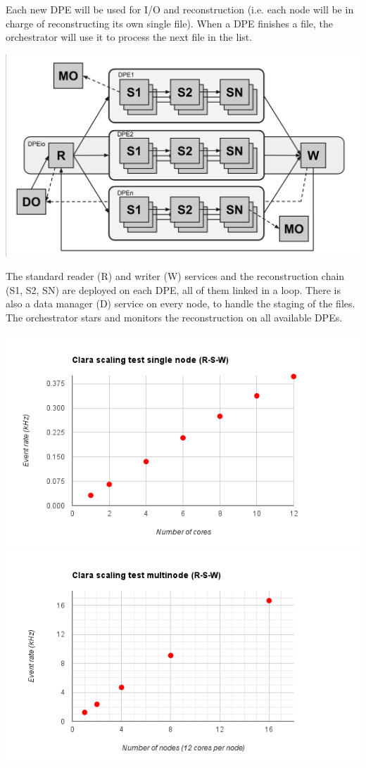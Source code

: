 \documentclass[a0paper,portrait]{baposter}
\begin{document}
\begin{poster}
{  Each new DPE will be used for I/O and reconstruction (i.e. each node will be
  in charge of reconstructing its own single file). When a DPE finishes a
  file, the orchestrator will use it to process the next file in the list.


\begin{center}
\includegraphics[width=0.7\linewidth]{multinode-reconstruction}
\end{center}

The standard reader (R) and writer (W) services and the reconstruction chain
(S1, S2, SN) are deployed on each DPE, all of them linked in a loop. There is
also a data manager (D) service on every node, to handle the staging of the
files. The orchestrator stars and monitors the reconstruction on all available
DPEs.

\begin{center}
\includegraphics[width=0.49\linewidth]{scaling-singlenode}
\includegraphics[width=0.49\linewidth]{scaling-multinode}
\end{center}

}
\end{poster}
\end{document}
